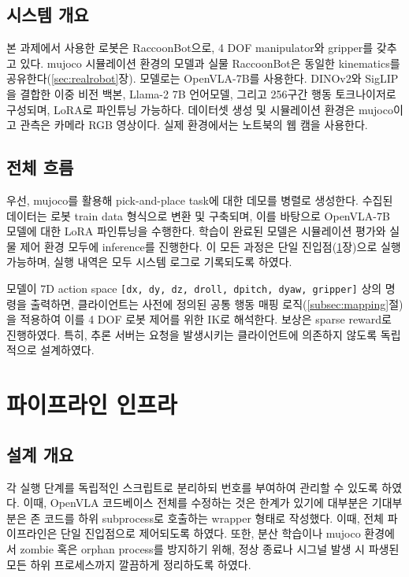 \documentclass[11pt,a4paper]{article}
\begin{document}
\subsection{시스템 개요}
\label{subsec:target}

본 과제에서 사용한 로봇은 RaccoonBot으로, 4 DOF manipulator와 gripper를 갖추고 있다. mujoco 시뮬레이션 환경의
모델과 실물 RaccoonBot은 동일한 kinematics를 공유한다(\ref{sec:realrobot}장). 모델로는 OpenVLA-7B를 사용한다.
DINOv2와 SigLIP을 결합한 이중 비전 백본, Llama-2 7B 언어모델, 그리고 256구간 행동 토크나이저로
구성되며, LoRA로 파인튜닝 가능하다. 데이터셋 생성 및 시뮬레이션 환경은 mujoco이고
관측은 카메라 RGB 영상이다. 실제 환경에서는 노트북의 웹 캠을 사용한다.

\subsection{전체 흐름}
\label{subsec:flow}

우선, mujoco를 활용해 pick-and-place task에 대한 데모를 병렬로 생성한다.
수집된 데이터는 로봇 train data 형식으로 변환 및 구축되며,
이를 바탕으로 OpenVLA-7B 모델에 대한 LoRA 파인튜닝을 수행한다.
학습이 완료된 모델은 시뮬레이션 평가와 실물 제어 환경 모두에 inference를 진행한다.
이 모든 과정은 단일 진입점(\ref{sec:infra}장)으로 실행 가능하며,
실행 내역은 모두 시스템 로그로 기록되도록 하였다.

모델이 7D action space \texttt{[dx, dy, dz, droll, dpitch, dyaw, gripper]} 상의 명령을 출력하면,
클라이언트는 사전에 정의된 공통 행동 매핑 로직(\ref{subsec:mapping}절)을 적용하여
이를 4 DOF 로봇 제어를 위한 IK로 해석한다. 보상은 sparse reward로 진행하였다.
특히, 추론 서버는 요청을 발생시키는 클라이언트에 의존하지 않도록 독립적으로 설계하였다.

\section{파이프라인 인프라}
\label{sec:infra}

\subsection{설계 개요}
\label{subsec:infra-solution}

각 실행 단계를 독립적인 스크립트로 분리하되 번호를 부여하여 관리할 수 있도록 하였다.
이때, OpenVLA 코드베이스 전체를 수정하는 것은 한계가 있기에
대부분은 기대부분은 존 코드를 하위 subprocess로 호출하는 wrapper 형태로 작성했다.
이때, 전체 파이프라인은 단일 진입점으로 제어되도록 하였다.
또한, 분산 학습이나 mujoco 환경에서 zombie 혹은 orphan process를 방지하기 위해,
정상 종료나 시그널 발생 시 파생된 모든 하위 프로세스까지 깔끔하게 정리하도록 하였다.
\end{document}
